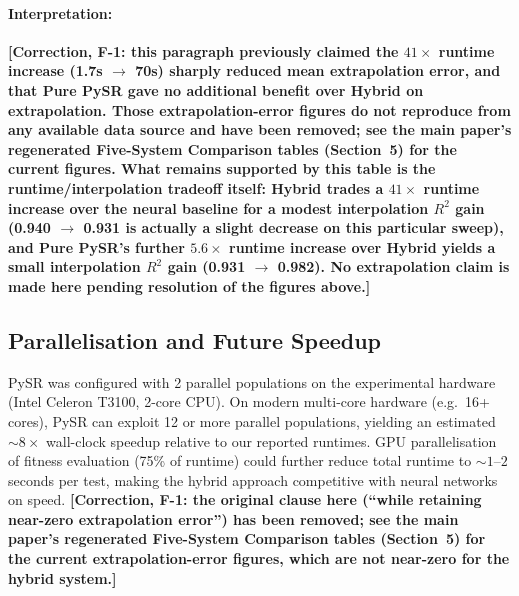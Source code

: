 \documentclass[twoside,11pt]{article}
\begin{document}
\paragraph{Interpretation:} \textbf{[Correction, F-1: this paragraph
previously claimed the $41\times$ runtime increase (1.7s $\to$ 70s) sharply
reduced mean extrapolation error, and that Pure PySR gave no additional
benefit over Hybrid on extrapolation. Those extrapolation-error figures do
not reproduce from any available data source and have been removed; see
the main paper's regenerated Five-System Comparison tables (Section~5) for
the current figures. What remains supported by this
table is the runtime/interpolation tradeoff itself: Hybrid trades a
$41\times$ runtime increase over the neural baseline for a modest
interpolation $R^2$ gain (0.940 $\to$ 0.931 is actually a slight decrease
on this particular sweep), and Pure PySR's further $5.6\times$ runtime
increase over Hybrid yields a small interpolation $R^2$ gain (0.931 $\to$
0.982). No extrapolation claim is made here pending resolution of the
figures above.]}

\subsection{Parallelisation and Future Speedup}

PySR was configured with 2 parallel populations on the experimental hardware (Intel Celeron T3100, 2-core CPU). On modern multi-core hardware (e.g.\ 16+ cores), PySR can exploit 12 or more parallel populations, yielding an estimated ${\sim}8\times$ wall-clock speedup relative to our reported runtimes. GPU parallelisation of fitness evaluation (75\% of runtime) could further reduce total runtime to ${\sim}1$--$2$ seconds per test, making the hybrid approach competitive with neural networks on speed. \textbf{[Correction, F-1: the original clause here (``while retaining near-zero extrapolation error'') has been removed; see the main paper's regenerated Five-System Comparison tables (Section~5) for the current extrapolation-error figures, which are not near-zero for the hybrid system.]}


\end{document}

